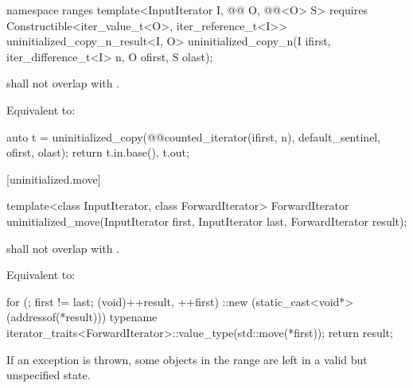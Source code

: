 \begin{addedblock}
%
\begin{itemdecl}
namespace ranges {
  template<InputIterator I, @@ O, @@<O> S>
      requires Constructible<iter_value_t<O>, iter_reference_t<I>>
    uninitialized_copy_n_result<I, O>
      uninitialized_copy_n(I ifirst, iter_difference_t<I> n, O ofirst, S olast);
}
\end{itemdecl}

\begin{itemdescr}
\pnum
\expects
{} shall not overlap with
.

\pnum
\effects Equivalent to:
\begin{codeblock}
auto t = uninitialized_copy(@@counted_iterator(ifirst, n),
                            default_sentinel{}, ofirst, olast);
return {t.in.base(), t.out};
\end{codeblock}
\end{itemdescr}
\end{addedblock}

[uninitialized.move]{}

%
\begin{itemdecl}
template<class InputIterator, class ForwardIterator>
  ForwardIterator uninitialized_move(InputIterator first, InputIterator last,
                                     ForwardIterator result);
\end{itemdecl}

\begin{itemdescr}
\begin{addedblock}
\pnum
\expects
{} shall not overlap with .
\end{addedblock}

\pnum
\effects
Equivalent to:
\begin{codeblock}
for (; first != last; (void)++result, ++first)
  ::new (static_cast<void*>(addressof(*result)))
    typename iterator_traits<ForwardIterator>::value_type(std::move(*first));
return result;
\end{codeblock}

\pnum
\remarks
If an exception is thrown, some objects in the range 
are left in a valid but unspecified state.
\end{itemdescr}

